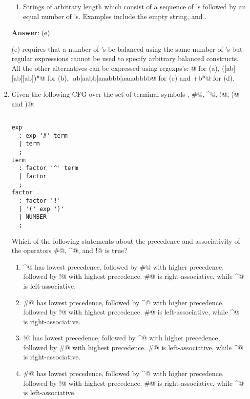 \documentclass[12pt]{article}
\begin{document}
\begin{enumerate}
\begin{enumerate}
\item Strings of arbitrary length which consist of
  a sequence of \verb@a@'s followed by an equal number of \verb@b@'s.
  Examples include the empty string, \verb@ab@ and \verb@aaaabbbb@.

\end{enumerate}

\textbf{Answer}: (e).

(e) requires that a number of \verb@a@'s be balanced using the same
number of \verb@b@'s but regular expressions cannot be used to specify
arbitrary balanced constructs.  All the other alternatives can be
expressed using regexps's: \verb@[ab][ab][ab][ab][ab]@ for (a),
\verb@([ab][ab][ab])*@ for (b), \verb@|ab|aabb|aaabbb|aaaabbbb@ for
(c) and \verb@a+b*@ for (d).


\item Given the following CFG over the set of terminal symbols 
  \verb@NUMBER@, \verb@#@, \verb@^@, \verb@!@, \verb@(@ and \verb@)@:

\begin{verbatim}

exp
  : exp '#' term
  | term
  ;
term
  : factor '^' term
  | factor
  ;
factor
  : factor '!'
  | '(' exp ')'
  | NUMBER
  ;
\end{verbatim}

Which of the following statements about the precedence and associativity of
the operators \verb@#@, \verb@^@, and \verb@!@ is true?

\begin{enumerate}

  \item \verb@^@ has lowest precedence, followed by \verb@#@ with
    higher precedence, followed by \verb@!@ with highest precedence.
    \verb@#@ is right-associative, while \verb@^@ is left-associative.

  \item \verb@#@ has lowest precedence, followed by \verb@^@ with
    higher precedence, followed by \verb@!@ with highest precedence.
    \verb@#@ is left-associative, while \verb@^@ is right-associative.

  \item \verb@!@ has lowest precedence, followed by \verb@^@ with
    higher precedence, followed by \verb@#@ with highest precedence.
    \verb@#@ is left-associative, while \verb@^@ is right-associative.

  \item \verb@#@ has lowest precedence, followed by \verb@^@ with
    higher precedence, followed by \verb@!@ with highest precedence.
    \verb@#@ is right-associative, while \verb@^@ is left-associative.


\end{enumerate}
\end{enumerate}
\end{document}
